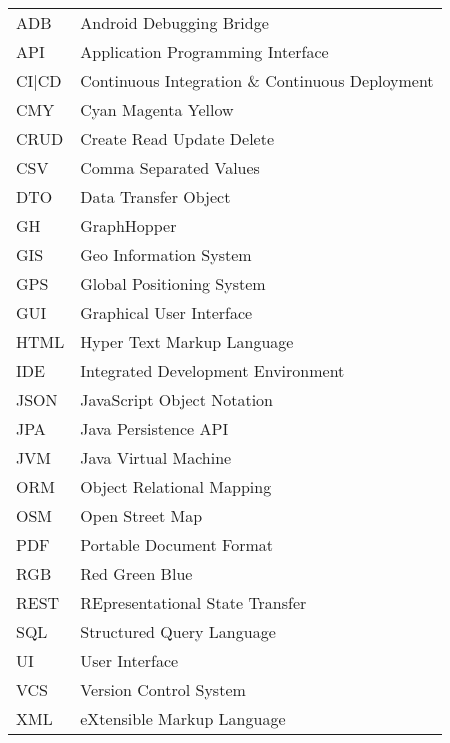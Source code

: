 \begin{singlespace}
  \begin{flushleft}
  \begin{longtable}{p{2 cm}p{14 cm}}
    ADB  & Android Debugging Bridge \\
    API  & Application Programming Interface \\
    CI|CD & Continuous Integration \& Continuous Deployment \\
    CMY  & Cyan Magenta Yellow \\
    CRUD & Create Read Update Delete \\
    CSV  & Comma Separated Values \\
    DTO  & Data Transfer Object \\
    GH   & GraphHopper \\
    GIS  & Geo Information System \\
    GPS  & Global Positioning System \\
    GUI  & Graphical User Interface \\
    HTML & Hyper Text Markup Language \\
    IDE  & Integrated Development Environment \\
    JSON & JavaScript Object Notation \\
    JPA  & Java Persistence API \\
    JVM  & Java Virtual Machine \\
    ORM  & Object Relational Mapping \\
    OSM  & Open Street Map \\
    PDF  & Portable Document Format \\
    RGB  & Red Green Blue \\
    REST & REpresentational State Transfer \\
    SQL  & Structured Query Language \\
    UI   & User Interface \\
    VCS  & Version Control System \\
    XML  & eXtensible Markup Language \\
  \end{longtable}
  \end{flushleft}
  \end{singlespace}
